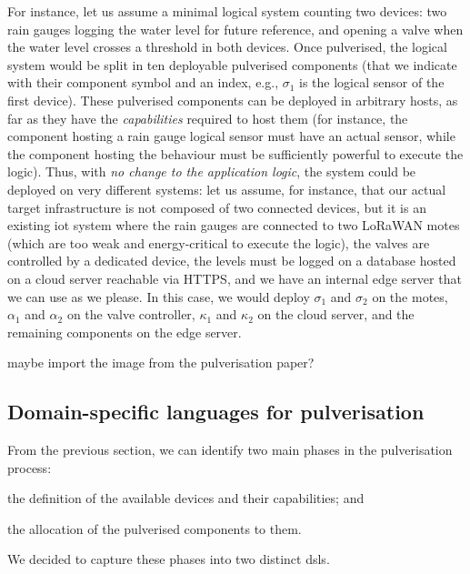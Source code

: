 \documentclass[conference]{IEEEtran}
\newcommand{\meta}[1]{{\color{blue}#1}}
\begin{document}
For instance, let us assume a minimal logical system counting two devices:
two rain gauges logging the water level for future reference,
and opening a valve when the water level crosses a threshold in both devices.
%
Once pulverised, the logical system would be split in ten deployable pulverised components
(that we indicate with their component symbol and an index, e.g., $\sigma_1$ is the logical sensor of the first device).
%
These pulverised components can be deployed in arbitrary hosts,
as far as they have the \emph{capabilities} required to host them
(for instance, the component hosting a rain gauge logical sensor must have an actual sensor,
while the component hosting the behaviour must be sufficiently powerful to execute the logic).
%
Thus, with \emph{no change to the application logic},
the system could be deployed on very different systems:
let us assume, for instance,
that our actual target infrastructure is not composed of two connected devices,
but it is an existing \ac{iot} system
where the rain gauges are connected to two LoRaWAN motes
(which are too weak and energy-critical to execute the logic),
the valves are controlled by a dedicated device,
the levels must be logged on a database hosted on a cloud server reachable via HTTPS,
and we have an internal edge server that we can use as we please.
%
In this case, we would deploy $\sigma_1$ and $\sigma_2$ on the motes,
$\alpha_1$ and $\alpha_2$ on the valve controller,
$\kappa_1$ and $\kappa_2$ on the cloud server,
and the remaining components on the edge server.

\meta{maybe import the image from the pulverisation paper?}

\subsection{Domain-specific languages for pulverisation}

From the previous section,
we can identify two main phases in the pulverisation process:
\begin{enumerate*}[label=\it{(\roman*)}]
  \item the definition of the available devices and their capabilities; and
  \item the allocation of the pulverised components to them.
\end{enumerate*}
%
We decided to capture these phases into two distinct \acp{dsl}.
\end{document}
